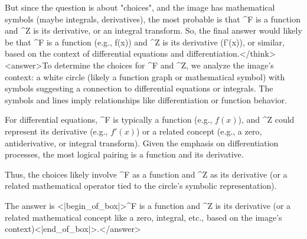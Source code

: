 But since the question is about "choices", and the image has mathematical symbols (maybe integrals, derivatives), the most probable is that ^F is a function and ^Z is its derivative, or an integral transform. So, the final answer would likely be that ^F is a function (e.g., f(x)) and ^Z is its derivative (f'(x)), or similar, based on the context of differential equations and differentiation.</think><answer>To determine the choices for ^F and ^Z, we analyze the image’s context: a white circle (likely a function graph or mathematical symbol) with symbols suggesting a connection to differential equations or integrals. The symbols and lines imply relationships like differentiation or function behavior.  

For differential equations, ^F is typically a function (e.g., \( f(x) \)), and ^Z could represent its derivative (e.g., \( f'(x) \)) or a related concept (e.g., a zero, antiderivative, or integral transform). Given the emphasis on differentiation processes, the most logical pairing is a function and its derivative.  

Thus, the choices likely involve ^F as a function and ^Z as its derivative (or a related mathematical operator tied to the circle’s symbolic representation).  

The answer is <|begin_of_box|>^F is a function and ^Z is its derivative (or a related mathematical concept like a zero, integral, etc., based on the image’s context)<|end_of_box|>.</answer>